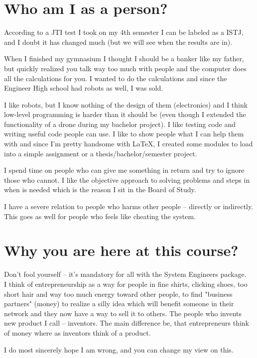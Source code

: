 \documentclass[oneside, 10pt]{article}
\begin{document}
\section{Who am I as a person?}
According to a JTI test I took on my 4th semester I can be labeled as a ISTJ, and I doubt it has changed much (but we will see when the results are in).

When I finished my gymnasium I thought I should be a banker like my father, but quickly realized you talk way too much with people and the computer does all the calculations for you.
I wanted to do the calculations and since the Engineer High school had robots as well, I was sold.

I like robots, but I know nothing of the design of them (electronics) and I think low-level programming is harder than it should be (even though I extended the functionality of a drone during my bachelor project).
I like testing code and writing useful code people can use.
I like to show people what I can help them with and since I'm pretty handsome with LaTeX, I created some modules to load into a simple assignment or a thesis/bachelor/semester project.

I spend time on people who can give me something in return and try to ignore those who cannot. 
I like the objective approach to solving problems and steps in when is needed which is the reason I sit in the Board of Study.

I have a severe relation to people who harms other people -- directly or indirectly. 
This goes as well for people who feels like cheating the system.



\section{Why you are here at this course?}
Don't fool yourself -- it's mandatory for all with the System Engineers package.
\\
I think of entrepreneurship as a way for people in fine shirts, clicking shoes, too short hair and way too much energy toward other people, to find "business partners" (money) to realize a silly idea which will benefit someone in their network and they now have a way to sell it to others.
The people who invents new product I call -- inventors. 
The main difference be, that entrepreneurs think of money where as inventors think of a product.

I do most sincerely hope I am wrong, and you can change my view on this.
\end{document}
